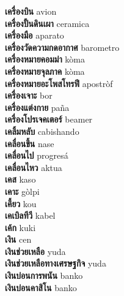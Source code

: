 \textbf{ เครื่องบิน  } avion \\
\textbf{ เครื่องปั้นดินเผา  } ceramica \\
\textbf{ เครื่องมือ  } aparato \\
\textbf{ เครื่องวัดความกดอากาศ  } barometro \\
\textbf{ เครื่องหมายคอมม่า  } kòma \\
\textbf{ เครื่องหมายจุลภาค  } kòma \\
\textbf{ เครื่องหมายอะโพสโทรฟี  } apostròf \\
\textbf{ เครื่องเจาะ  } bor \\
\textbf{ เครื่องแต่งกาย  } paña \\
\textbf{ เครื่องโปรเจคเตอร์  } beamer \\
\textbf{ เคลิ้มหลับ  } cabishando \\
\textbf{ เคลื่อนขึ้น  } nase \\
\textbf{ เคลื่อนไป  } progresá \\
\textbf{ เคลื่อนไหว  } aktua \\
\textbf{ เคส  } kaso \\
\textbf{ เคาะ  } gòlpi \\
\textbf{ เคี้ยว  } kou \\
\textbf{ เคเบิลทีวี  } kabel \\
\textbf{ เค้ก  } kuki \\
\textbf{ เงิน  } cen \\
\textbf{ เงินช่วยเหลือ  } yuda \\
\textbf{ เงินช่วยเหลือทางเศรษฐกิจ  } yuda \\
\textbf{ เงินบ่อนการพนัน  } banko \\
\textbf{ เงินบ่อนคาสิโน  } banko \\
